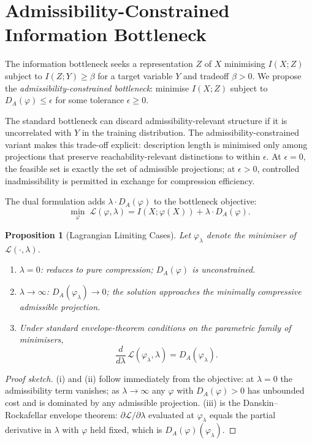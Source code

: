 \documentclass[10pt,twocolumn]{article}
\theoremstyle{plain}
\newtheorem{proposition}{Proposition}
\theoremstyle{definition}
\theoremstyle{remark}
\newcommand{\DA}{D_{A}(\varphi)}
\begin{document}
\section{Admissibility-Constrained Information Bottleneck}
\label{app:bottleneck}

The information bottleneck \citep{tishby1999information} seeks a representation
$Z$ of $X$ minimising $I(X;Z)$ subject to $I(Z;Y)\geq\beta$ for a target
variable $Y$ and tradeoff $\beta>0$. We propose the
\emph{admissibility-constrained bottleneck}: minimise $I(X;Z)$ subject to
$D_A(\varphi)\leq\epsilon$ for some tolerance $\epsilon\geq 0$.

The standard bottleneck can discard admissibility-relevant structure if it is
uncorrelated with $Y$ in the training distribution. The admissibility-constrained
variant makes this trade-off explicit: description length is minimised only among
projections that preserve reachability-relevant distinctions to within $\epsilon$.
At $\epsilon=0$, the feasible set is exactly the set of admissible projections;
at $\epsilon>0$, controlled inadmissibility is permitted in exchange for
compression efficiency.

The dual formulation adds $\lambda\cdot\DA$ to the bottleneck objective:
\[
  \min_\varphi\; \mathcal{L}(\varphi,\lambda) = I(X;\varphi(X)) + \lambda\cdot\DA.
\]

\begin{proposition}[Lagrangian Limiting Cases]
\label{prop:lagrange}
Let $\varphi_\lambda$ denote the minimiser of $\mathcal{L}(\cdot,\lambda)$.
\begin{enumerate}[label=(\roman*),noitemsep]
  \item $\lambda=0$: reduces to pure compression; $\DA$ is unconstrained.
  \item $\lambda\to\infty$: $D_A(\varphi_\lambda)\to 0$; the solution
    approaches the minimally compressive admissible projection.
  \item Under standard envelope-theorem conditions on the parametric family
    of minimisers,
    \[
      \frac{d}{d\lambda}\,\mathcal{L}(\varphi_\lambda,\lambda)
      = D_A(\varphi_\lambda).
    \]
\end{enumerate}
\end{proposition}

\begin{proof}[Proof sketch]
(i) and (ii) follow immediately from the objective: at $\lambda=0$ the
admissibility term vanishes; as $\lambda\to\infty$ any $\varphi$ with
$\DA>0$ has unbounded cost and is dominated by any admissible projection.
(iii) is the Danskin--Rockafellar envelope theorem: $\partial\mathcal{L}/\partial\lambda$
evaluated at $\varphi_\lambda$ equals the partial derivative in $\lambda$ with
$\varphi$ held fixed, which is $\DA(\varphi_\lambda)$.
\end{proof}
\end{document}
